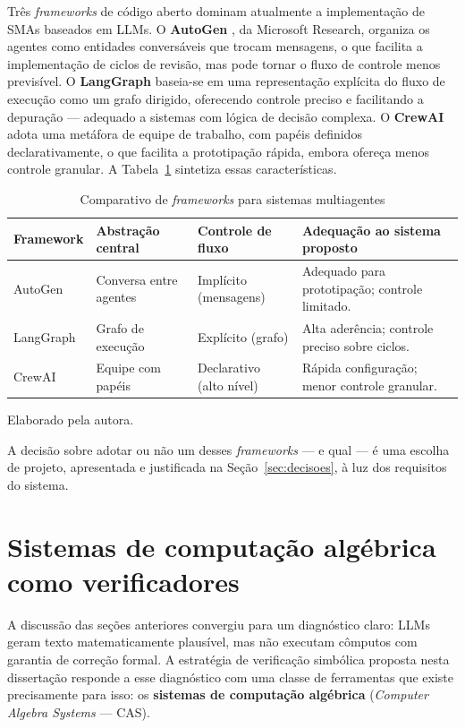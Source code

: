 Três \emph{frameworks} de código aberto dominam atualmente a implementação de SMAs baseados em LLMs.
O \textbf{AutoGen} \citep{wu2023autogen}, da Microsoft Research, organiza os agentes como entidades
conversáveis que trocam mensagens, o que facilita a implementação de ciclos de revisão, mas pode
tornar o fluxo de controle menos previsível. O \textbf{LangGraph} baseia-se em uma representação
explícita do fluxo de execução como um grafo dirigido, oferecendo controle preciso e facilitando a
depuração --- adequado a sistemas com lógica de decisão complexa. O \textbf{CrewAI} adota uma metáfora
de equipe de trabalho, com papéis definidos declarativamente, o que facilita a prototipação rápida,
embora ofereça menos controle granular. A Tabela~\ref{tab:frameworks} sintetiza essas características.

\begin{table}[htbp]
\centering
\caption{Comparativo de \emph{frameworks} para sistemas multiagentes}
\label{tab:frameworks}
\begin{tabular}{@{}p{2.2cm}p{3.0cm}p{2.8cm}p{4.0cm}@{}}
\toprule
\textbf{Framework} & \textbf{Abstração central} & \textbf{Controle de fluxo} & \textbf{Adequação ao sistema proposto} \\
\midrule
AutoGen & Conversa entre agentes & Implícito (mensagens) & Adequado para prototipação; controle limitado. \\
LangGraph & Grafo de execução & Explícito (grafo) & Alta aderência; controle preciso sobre ciclos. \\
CrewAI & Equipe com papéis & Declarativo (alto nível) & Rápida configuração; menor controle granular. \\
\bottomrule
\end{tabular}

\smallskip
{\footnotesize Elaborado pela autora.}
\end{table}

A decisão sobre adotar ou não um desses \emph{frameworks} --- e qual --- é uma escolha de projeto,
apresentada e justificada na Seção~\ref{sec:decisoes}, à luz dos requisitos do sistema.

\section{Sistemas de computação algébrica como verificadores}
\label{sec:cas}

A discussão das seções anteriores convergiu para um diagnóstico claro: LLMs geram texto
matematicamente plausível, mas não executam cômputos com garantia de correção formal. A estratégia de
verificação simbólica proposta nesta dissertação responde a esse diagnóstico com uma classe de
ferramentas que existe precisamente para isso: os \textbf{sistemas de computação algébrica}
(\emph{Computer Algebra Systems} --- CAS).

